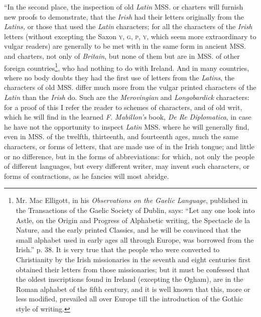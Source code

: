 \documentclass[11pt,oneside]{memoir}
\begin{document}
``In the second place, the inspection of old \textit{Latin} MSS. or charters will furnish new proofs to demonstrate, that the \textit{Irish} had their letters originally from the \textit{Latins,} or those that used the \textit{Latin} characters; for all the characters of the \textit{Irish} letters (without excepting the Saxon \textsc{y}, \textsc{g}, \textsc{p}, \textsc{y}, which seem more extraordinary to vulgar readers) are generally to be met with in the same form in ancient MSS. and charters, not only of \textit{Britain}, but none of them but are in MSS. of other foreign countries\footnote{
    Mr. Mac Elligott, in his \textit{Observations on the Gaelic Language}, published in the Transactions of the Gaelic Society of Dublin, says: ``Let any one look into Astle, on the Origin and Progress of Alphabetic writing, the Spectacle de la Nature, and the early printed Classics, and he will be convinced that the small alphabet used in early ages all through Europe, was borrowed from the Irish.'' p. 38.
    It is very true that the people who were converted to Christianity by the Irish missionaries in the seventh and eight centuries first obtained their letters from those missionaries; but it must be confessed that the oldest inscriptions found in Ireland (excepting the Ogham), are in the Roman alphabet of the fifth century, and it is well known that this, more or less modified, prevailed all over Europe till the introduction of the Gothic style of writing.

}, who had nothing to do with Ireland. 
And in many countries, where no body doubts they had the first use of letters from the \textit{Latins}, the characters of old MSS. differ much more from the vulgar printed characters of the \textit{Latin} than the \textit{Irish} do.
Such are the \textit{Merovingian} and \textit{Longobardick} characters: for a proof of this I refer the reader to schemes of characters, and of old writ, which he will find in the learned \textit{F. Mabillon's} book, \textit{De Re Diplomatica}, in case he have not the opportunity to inspect \textit{Latin} MSS. where he will generally find, even in MSS. of the twelfth, thirteenth, and fourteenth ages, much the same characters, or forms of letters, that are made use of in the Irish tongue; and little or no difference, but in the forms of abbreviations: for which, not only the people of different languages, but every different writer, may invent such characters, or forms of contractions, as he fancies will most abridge. 
\end{document}
